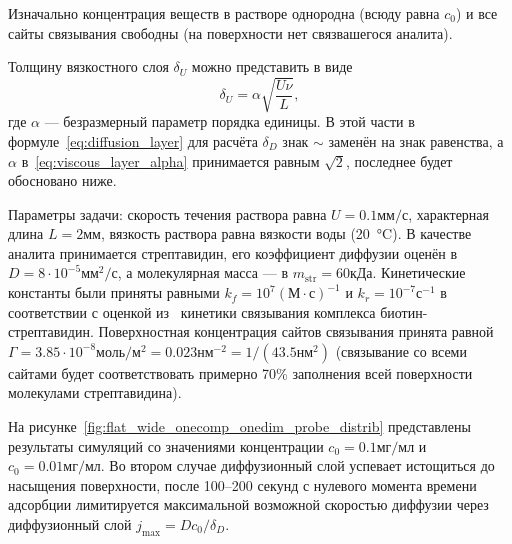 \documentclass[oneside,final,12pt]{extreport}
\begin{document}
Изначально концентрация веществ в растворе однородна (всюду равна $c_0$) и
все сайты связывания свободны (на поверхности нет связвашегося аналита).

Толщину вязкостного слоя $\delta_U$ можно представить в виде
\begin{equation}
  \label{eq:viscous_layer_alpha}
  \delta_U = \alpha\sqrt{\frac{U\nu}{L}},
\end{equation}
где $\alpha$ --- безразмерный параметр порядка единицы.
В этой части в формуле~\eqref{eq:diffusion_layer} для расчёта $\delta_D$
знак $\sim$ заменён на знак равенства, а
$\alpha$ в~\eqref{eq:viscous_layer_alpha} принимается равным $\sqrt{2}$,
последнее будет обосновано ниже.

Параметры задачи:%
скорость течения раствора равна $U = 0.1\text{мм}/\text{с}$,
характерная длина $L = 2\text{мм}$,
вязкость раствора равна вязкости воды (\SI{20}{\celsius}).
В качестве аналита принимается стрептавидин,
его коэффициент диффузии оценён в $D = 8\cdot10^{-5}\text{мм}^2/\text{с}$,
а молекулярная масса --- в $m_{\text{str}} = 60\text{кДа}$.
Кинетические константы были приняты равными%
\label{streptavidin_kinetics}
$k_f = 10^7\left(\text{М}\cdot\text{с}\right)^{-1}$
и $k_r = 10^{-7}\text{с}^{-1}$ в соответствии с оценкой из~%
\cite{bib:biotin_streptavidin_kinetics}
кинетики связывания комплекса биотин-стрептавидин.
Поверхностная концентрация сайтов связывания принята равной%
\label{Gamma0.7}
$\Gamma = 3.85\cdot10^{-8}\text{моль}/\text{м}^2 = 0.023\text{нм}^{-2} = 1/\left(43.5\text{нм}^2\right)$
(связывание со всеми сайтами будет соответствовать примерно
70\% заполнения всей поверхности молекулами стрептавидина).

На рисунке~\ref{fig:flat_wide_onecomp_onedim_probe_distrib}
представлены результаты симуляций со значениями концентрации
$c_0 = 0.1 \text{мг}/\text{мл}$ и $c_0 = 0.01 \text{мг}/\text{мл}$.
Во втором случае диффузионный слой успевает истощиться до насыщения поверхности,
после 100--200 секунд с нулевого момента времени адсорбции лимитируется
максимальной возможной скоростью диффузии через диффузионный слой
$j_{\text{max}} = D c_0 / \delta_D$.
\end{document}
